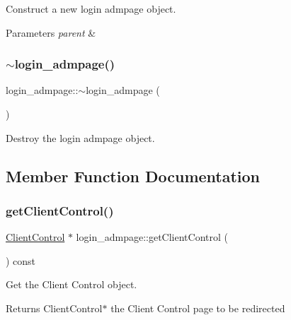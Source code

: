 Construct a new login admpage object. 


\begin{DoxyParams}{Parameters}
{\em parent} & \\
\hline
\end{DoxyParams}
\mbox{\label{classlogin__admpage_a48e361ef6611dfa6e16810b53b7a9e13}} 
\subsubsection{\texorpdfstring{$\sim$login\+\_\+admpage()}{~login\_admpage()}}
{\footnotesize\ttfamily login\+\_\+admpage\+::$\sim$login\+\_\+admpage (\begin{DoxyParamCaption}{ }\end{DoxyParamCaption})}



Destroy the login admpage object. 



\subsection{Member Function Documentation}
\mbox{\label{classlogin__admpage_ab56e43d37e9f9944afbcb17f3740b365}} 
\subsubsection{\texorpdfstring{get\+Client\+Control()}{getClientControl()}}
{\footnotesize\ttfamily \hyperlink{classClientControl}{Client\+Control} $\ast$ login\+\_\+admpage\+::get\+Client\+Control (\begin{DoxyParamCaption}{ }\end{DoxyParamCaption}) const}



Get the Client Control object. 

\begin{DoxyReturn}{Returns}
Client\+Control$\ast$ the Client Control page to be redirected 
\end{DoxyReturn}
\mbox{\label{classlogin__admpage_a6765491709543f3d887989ce9e76917d}} 
